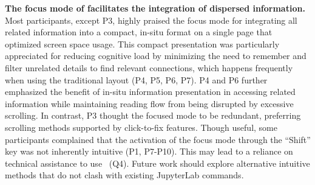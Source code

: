 \textbf{The focus mode of \tool facilitates the integration of dispersed information.}
Most participants, except P3, highly praised the focus mode for integrating all related information into a compact, in-situ format on a single page that optimized screen space usage.
This compact presentation was particularly appreciated for reducing cognitive load by minimizing the need to remember and filter unrelated details to find relevant connections, which happens frequently when using the traditional layout (P4, P5, P6, P7).
P4 and P6 further emphasized the benefit of in-situ information presentation in accessing related information while maintaining reading flow from being disrupted by excessive scrolling.
In contrast, P3 thought the focused mode to be redundant, preferring scrolling methods supported by click-to-fix features.
Though useful, some participants complained that the activation of the focus mode through the ``Shift'' key was not inherently intuitive (P1, P7-P10).
This may lead to a reliance on technical assistance to use \tool~(Q4).
Future work should explore alternative intuitive methods that do not clash with existing JupyterLab commands.



